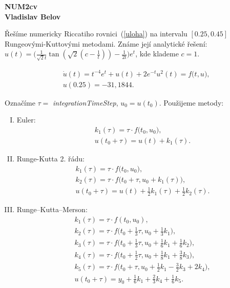 \documentclass[11pt,american,czech]{article}
\begin{document}
\def\documentdate{24. dubna 2017}
\begin{flushright}
\textbf{	NUM2cv \\
	Vladislav Belov}
\end{flushright}

Řešíme numericky Riccatiho rovnici~(\ref{uloha}) na intervalu $[0.25, 0.45]$ Rungeovými-Kuttovými metodami. Známe její analytické řešení: $u(t)=\big(\frac{1}{\sqrt{2}t}\tan{(\sqrt{2}(c-\frac{1}{t}))}-\frac{1}{2t}\big)e^{t}$, kde klademe $c=1$.

\begin{equation} \label{uloha}
	\begin{split}
		&\dot{u}(t)=t^{-4}e^{t}+u(t)+2e^{-t}u^{2}(t) = f\big(t, u\big), \\
		&u(0.25)=-31,1844.
	\end{split}
\end{equation}

\noindent
Označíme $\tau=$ \textit{integrationTimeStep}, $u_{0}=u(t_{0})$. Použijeme  metody:
\begin{enumerate}[I.]
	\item Euler:
		\begin{equation*}
			\begin{split}
	&k_{1}(\tau)=\tau\cdot f\big(t_{0}, u_{0}\big), \\
	&u(t_0+\tau)=u(t) + k_{1}(\tau).
			\end{split}
		\end{equation*}
	\item Runge-Kutta 2. řádu: \label{RKII}
		\begin{equation*}
			\begin{split}
				&k_{1}(\tau)=\tau\cdot f\big(t_{0}, u_{0}\big), \\
				&k_{2}(\tau)=\tau\cdot f\big(t_{0}+\tau, u_{0}+k_{1}(\tau)\big), \\
				&u(t_0+\tau)=u(t) + \tfrac{1}{2}k_{1}(\tau)+\tfrac{1}{2}k_{2}(\tau).
			\end{split}
		\end{equation*}
	\item Runge–Kutta–Merson:
		\begin{equation*}
			\begin{split}
		&k_{1}(\tau) = \tau\cdot f(t_{0},u_{0}),\\
		&k_{2}(\tau) = \tau\cdot f \big( t_{0} + \tfrac13 \tau, u_{0} + \tfrac13 k_1 \big),\\
		&k_{3}(\tau) = \tau\cdot f \big( t_{0} + \tfrac13 \tau, u_{0} + \tfrac16 k_1 + \tfrac16 k_2 \big),\\
		&k_{4}(\tau) = \tau\cdot f \big( t_{0} + \tfrac12 \tau, u_{0} + \tfrac18 k_1 + \tfrac38 k_3 \big),\\
		&k_{5}(\tau) = \tau\cdot f \big( t_{0} + \tau, u_{0} + \tfrac12 k_1 - \tfrac32 k_3 + 2 k_4 \big),\\
		&u(t_{0}+\tau) = y_0 + \tfrac16 k_1 + \tfrac23 k_4 + \tfrac16 k_5.
			\end{split}
		\end{equation*}
\end{enumerate}
\end{document}
